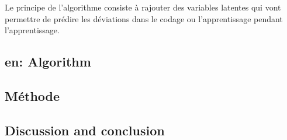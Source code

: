 
Le principe de l'algorithme consiste à rajouter des variables latentes
qui vont permettre de prédire les déviations dans le codage ou
l'apprentissage pendant l'apprentissage.

\hypertarget{algorithm}{%
\subsection{en: Algorithm}\label{algorithm}}

\hypertarget{muxe9thode}{%
\subsection{Méthode}\label{muxe9thode}}


\subsection{Discussion and conclusion}\label{discussion-et-conclusion}
